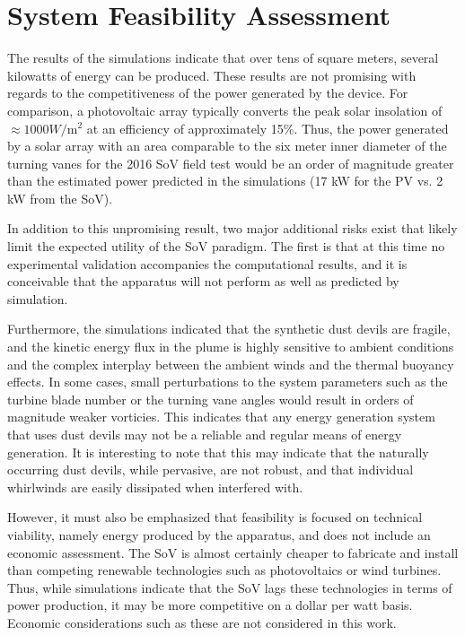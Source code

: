 %
%
\section{System Feasibility Assessment}

The results of the simulations indicate that over tens of square meters,
several kilowatts of energy can be produced. These results are not
promising with regards to the competitiveness of the power generated by
the device. For comparison, a photovoltaic array typically converts 
the peak solar insolation of $\approx 1000 W/\text{m}^2$ at an efficiency 
of approximately 15\%. Thus, the power generated by a solar array with 
an area comparable to the six meter inner diameter of the turning 
vanes for the 2016 SoV field test would be an order of magnitude greater than 
the estimated power predicted in the simulations 
(17 kW for the PV vs. 2 kW from the SoV). 

In addition to this unpromising result, two major additional risks 
exist that likely limit the expected utility of the SoV paradigm. 
The first is that at this time no experimental validation accompanies the
computational results, and it is conceivable that the apparatus will not
perform as well as predicted by simulation.  

Furthermore, the simulations indicated that the synthetic dust devils 
are fragile, and
the kinetic energy flux in the plume is highly sensitive to ambient
conditions and the complex interplay between the ambient winds and the
thermal buoyancy effects. In some cases, small perturbations to the
system parameters such as the turbine blade number or the turning vane
angles would result in orders of magnitude weaker vorticies. 
This indicates that any energy generation system that uses dust
devils may not be a reliable and regular means of energy generation. 
It is interesting to note that this may indicate that the 
naturally occurring dust devils, 
while pervasive, are not robust, and that individual whirlwinds are 
easily dissipated when interfered with. 

However, it must also be emphasized that feasibility is focused on
technical viability, namely energy produced by the apparatus, and does
not include an economic assessment. The SoV is almost certainly cheaper
to fabricate and install than competing renewable technologies such as
photovoltaics or wind turbines. Thus, while simulations indicate that
the SoV lags these technologies in terms of power production, it may be
more competitive on a dollar per watt basis. Economic considerations 
such as these are not considered in this work. 

